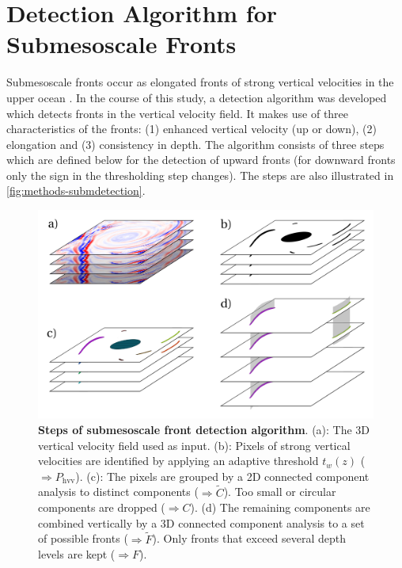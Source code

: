 \section{Detection Algorithm for Submesoscale Fronts}\label{sec:data-methods-submdet}

Submesoscale fronts occur as elongated fronts of strong vertical velocities in the upper ocean \autocite{mcwilliams-2016-subm-currents}. In the course of this study, a detection algorithm was developed which detects fronts in the vertical velocity field. It makes use of three characteristics of the fronts: (1) enhanced vertical velocity (up or down), (2) elongation and (3) consistency in depth. The algorithm consists of three steps which are defined below for the detection of upward fronts (for downward fronts only the sign in the thresholding step changes). The steps are also illustrated in \autoref{fig:methods-submdetection}.\\
\begin{figure}[h]
    \centering
    \includegraphics[width=12cm, trim=0 0 0 0]{../figures/subm_algorithm.png}
    \caption[Steps of submesoscale front detection algorithm]{\textbf{Steps of submesoscale front detection algorithm}. (a): The 3D vertical velocity field used as input. (b): Pixels of strong vertical velocities are identified by applying an adaptive threshold $t_w(z)$ ($\Rightarrow P_\text{hvv}$). (c): The pixels are grouped by a 2D connected component analysis to distinct components ($\Rightarrow \widetilde{C}$). Too small or circular components are dropped ($\Rightarrow C$). (d) The remaining components are combined vertically by a 3D connected component analysis to a set of possible fronts ($\Rightarrow \widetilde{F}$). Only fronts that exceed several depth levels are kept ($\Rightarrow F$).}\label{fig:methods-submdetection}
\end{figure}
